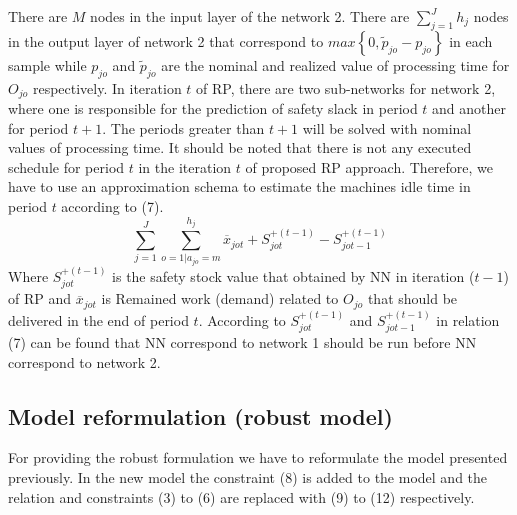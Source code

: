 \documentclass[letterpaper]{article} %
\begin{document}
There are $M$ nodes in the input layer of the network 2. There are $\sum_{j=1}^{J} h_{j}$ nodes in the output layer of network 2 that correspond to $\textit{max}\left\{0,\tilde{p}_{jo}-p_{jo}\right\}$ in each sample while $p_{jo}$ and $\tilde{p}_{jo}$ are the nominal and realized value of processing time for $O_{jo}$ respectively. In iteration $t$ of RP, there are two sub-networks for network 2,   where one is responsible for the prediction of safety slack in period $t$ and another for period $t+1$. The periods greater than $t+1$ will be solved with nominal values of processing time. It should be noted that there is not any executed schedule for period $t$ in the iteration $t$ of proposed RP approach. Therefore, we have to use an approximation schema to estimate the machines idle time in period $t$ according to (7).
\begin{equation}
\sum_{j=1}^{J} \sum_{o=1|a_{jo}=m}^{h_{j}} \overline{x}_{jot}+S_{jot}^{+(t-1)}-S_{jot-1}^{+(t-1)}
\end{equation}
Where $S_{jot}^{+(t-1)}$ is the safety stock value that obtained by NN in iteration ($t-1$) of RP and $\overline{x}_{jot}$ is Remained work (demand) related to $O_{jo}$ that should be delivered in the end of period $t$.
According to $S_{jot}^{+(t-1)}$ and $S_{jot-1}^{+(t-1)}$ in relation (7) can be found that NN correspond to network 1 should be run before NN correspond to network 2.

\subsection{Model reformulation (robust model)}
For providing the robust formulation we have to reformulate the model presented previously. In the new model the constraint (8) is added to the model and the relation and constraints (3) to (6) are replaced with (9) to (12) respectively.
\end{document}
